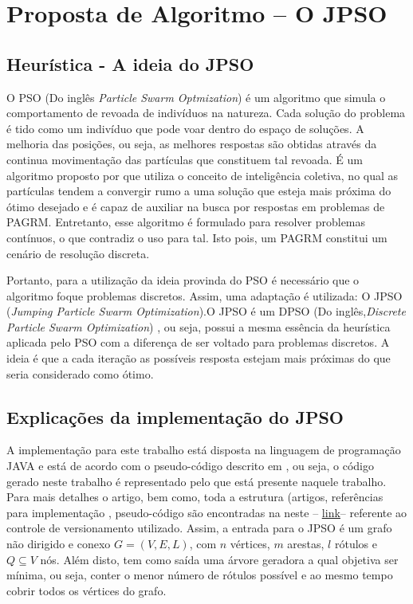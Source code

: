 \documentclass{sig-alternate-05-2015}
\begin{document}
\section{Proposta de Algoritmo -- O JPSO} \label{sec3}

\subsection{Heurística - A ideia do JPSO}

O PSO (Do inglês \textit{Particle Swarm Optmization}) é um algoritmo que simula o comportamento de revoada de indivíduos na natureza. Cada solução do problema é tido como um indivíduo que pode voar dentro do espaço de soluções. A melhoria das posições, ou seja, as melhores respostas são obtidas através da continua movimentação das partículas que constituem tal revoada. É um algoritmo proposto por \cite{consoli2008discrete} que utiliza o conceito de inteligência coletiva, no qual as partículas tendem a convergir rumo a uma solução que esteja mais próxima do ótimo desejado e é capaz de auxiliar na busca por respostas em problemas de PAGRM. Entretanto, esse algoritmo é formulado para resolver problemas contínuos, o que contradiz o uso para tal. Isto pois, um PAGRM constitui um cenário de resolução discreta.


Portanto, para a utilização da ideia provinda do PSO  é necessário que o algoritmo foque problemas discretos. Assim, uma adaptação é utilizada: O JPSO (\textit{Jumping Particle Swarm Optimization}).O JPSO  é um DPSO (Do inglês,\textit{Discrete Particle Swarm Optimization}) \cite{} , ou seja, possui 
a mesma essência da heurística aplicada pelo PSO com a diferença de ser voltado para problemas discretos. A ideia é que a cada iteração as possíveis resposta estejam mais próximas do que seria considerado como ótimo. 

\subsection{Explicações da implementação do JPSO}
A implementação para este trabalho está disposta na linguagem de programação JAVA  e está de acordo com o pseudo-código descrito em \cite{consoli2008discrete}, ou seja, o código gerado neste trabalho é representado pelo que está presente naquele trabalho. Para mais detalhes o artigo, bem como, toda a estrutura (artigos, referências para implementação , pseudo-código são encontradas na neste  -- \href{https://github.com/felipeveigaramos/Teoria-dos-grafos--arvore-geradora-de-rotulos-minimos}{\color{Blue}\underline{link}}-- referente ao controle de versionamento utilizado. Assim, a entrada 
para o JPSO é um grafo não dirigido e conexo $G = (V,E,L)$, com $n$ vértices, $m$ arestas, $l$ rótulos e $Q \subseteq V$ nós. Além disto, tem como 
saída uma árvore geradora a qual objetiva ser mínima, ou seja, conter o menor número de rótulos possível e ao mesmo tempo cobrir todos os vértices do grafo. 
\end{document}
